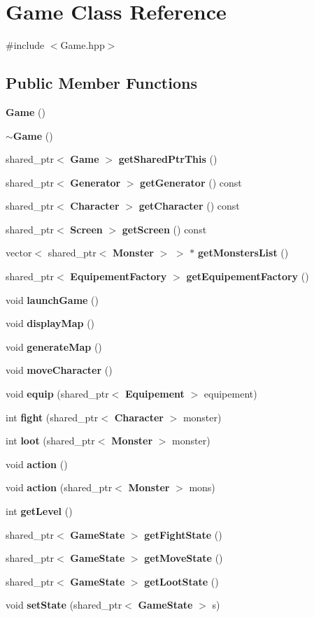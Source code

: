 \section{Game Class Reference}
\label{class_game}


{\ttfamily \#include $<$Game.\-hpp$>$}

\subsection*{Public Member Functions}
\begin{DoxyCompactItemize}
\item 
{\bf Game} ()
\item 
{\bf $\sim$\-Game} ()
\item 
shared\-\_\-ptr$<$ {\bf Game} $>$ {\bf get\-Shared\-Ptr\-This} ()
\item 
shared\-\_\-ptr$<$ {\bf Generator} $>$ {\bf get\-Generator} () const 
\item 
shared\-\_\-ptr$<$ {\bf Character} $>$ {\bf get\-Character} () const 
\item 
shared\-\_\-ptr$<$ {\bf Screen} $>$ {\bf get\-Screen} () const 
\item 
vector$<$ shared\-\_\-ptr$<$ {\bf Monster} $>$ $>$ $\ast$ {\bf get\-Monsters\-List} ()
\item 
shared\-\_\-ptr$<$ {\bf Equipement\-Factory} $>$ {\bf get\-Equipement\-Factory} ()
\item 
void {\bf launch\-Game} ()
\item 
void {\bf display\-Map} ()
\item 
void {\bf generate\-Map} ()
\item 
void {\bf move\-Character} ()
\item 
void {\bf equip} (shared\-\_\-ptr$<$ {\bf Equipement} $>$ equipement)
\item 
int {\bf fight} (shared\-\_\-ptr$<$ {\bf Character} $>$ monster)
\item 
int {\bf loot} (shared\-\_\-ptr$<$ {\bf Monster} $>$ monster)
\item 
void {\bf action} ()
\item 
void {\bf action} (shared\-\_\-ptr$<$ {\bf Monster} $>$ mons)
\item 
int {\bf get\-Level} ()
\item 
shared\-\_\-ptr$<$ {\bf Game\-State} $>$ {\bf get\-Fight\-State} ()
\item 
shared\-\_\-ptr$<$ {\bf Game\-State} $>$ {\bf get\-Move\-State} ()
\item 
shared\-\_\-ptr$<$ {\bf Game\-State} $>$ {\bf get\-Loot\-State} ()
\item 
void {\bf set\-State} (shared\-\_\-ptr$<$ {\bf Game\-State} $>$ s)
\end{DoxyCompactItemize}


